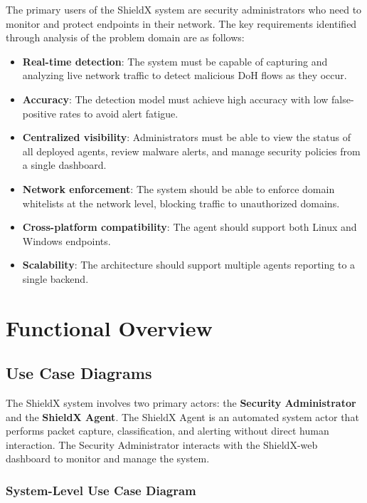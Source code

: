 \documentclass[../Main.tex]{subfiles}
\begin{document}
The primary users of the ShieldX system are security administrators who need to monitor and protect endpoints in their network. The key requirements identified through analysis of the problem domain are as follows:

\begin{itemize}
    \item \textbf{Real-time detection}: The system must be capable of capturing and analyzing live network traffic to detect malicious DoH flows as they occur.
    \item \textbf{Accuracy}: The detection model must achieve high accuracy with low false-positive rates to avoid alert fatigue.
    \item \textbf{Centralized visibility}: Administrators must be able to view the status of all deployed agents, review malware alerts, and manage security policies from a single dashboard.
    \item \textbf{Network enforcement}: The system should be able to enforce domain whitelists at the network level, blocking traffic to unauthorized domains.
    \item \textbf{Cross-platform compatibility}: The agent should support both Linux and Windows endpoints.
    \item \textbf{Scalability}: The architecture should support multiple agents reporting to a single backend.
\end{itemize}

\section{Functional Overview}
\label{section:2.2}

\subsection{Use Case Diagrams}
\label{subsection:2.2.1}

The ShieldX system involves two primary actors: the \textbf{Security Administrator} and the \textbf{ShieldX Agent}. The ShieldX Agent is an automated system actor that performs packet capture, classification, and alerting without direct human interaction. The Security Administrator interacts with the ShieldX-web dashboard to monitor and manage the system.

\subsubsection{System-Level Use Case Diagram}
\end{document}
